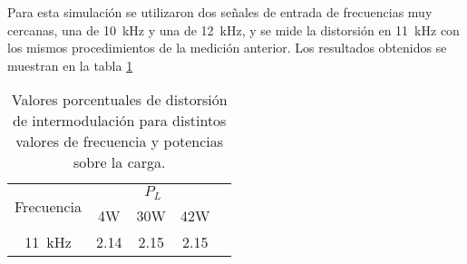 
Para esta simulación se utilizaron dos señales de entrada de frecuencias muy cercanas, una de \SI{10}{\kHz} y una de \SI{12}{\kHz}, y se mide la distorsión en \SI{11}{\kHz} con los mismos procedimientos de la medición anterior. Los resultados obtenidos se muestran en la tabla \ref{tab.intermod}

\begin{table}[H]
	\centering
	\begin{tabular}{ccccc}
		\toprule
\multirow{2}{*}{Frecuencia} & \multicolumn{3}{c}{$P_L$} \\ 
		\cmidrule{2-4}
			& 4W & 30W & 42W \\
		\midrule
		 \SI{11}{\kHz} & \num{2.14} & \num{2.15} & \num{2.15}\\
		 \bottomrule
	\end{tabular}
	\caption{Valores porcentuales de distorsión de intermodulación para distintos valores de frecuencia y potencias sobre la carga.}
	\label{tab.intermod}
\end{table}
